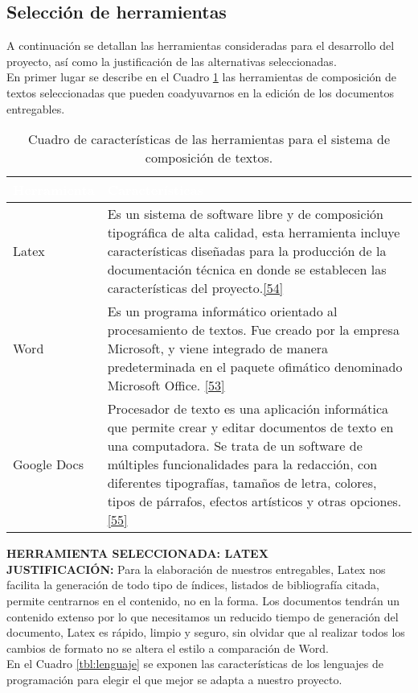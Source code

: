 \subsection{Selección de herramientas}

A continuación se detallan las herramientas consideradas para el desarrollo del proyecto, así como la justificación de las alternativas seleccionadas.\\

En primer lugar se describe en el Cuadro \ref{tbl:compotex} las herramientas de composición de textos seleccionadas que pueden coadyuvarnos en la edición de los documentos entregables.

\begin{table}[H]
	\centering
	\begin{tabular}{|p{3cm}|p{12cm}|}
		\hline
		 \rowcolor{black} \textcolor{white}{\textbf{Herramienta}} & \textcolor{white}{\textbf{Características}}  \\ \hline
		Latex & Es un sistema de software libre y de composición tipográfica de alta calidad, esta herramienta incluye características diseñadas para la producción de la documentación técnica en donde se establecen las características del proyecto.\hyperlink{b54}{[54]}\\
		\hline
		Word & Es un programa informático orientado al procesamiento de textos. Fue creado por la empresa Microsoft, y viene integrado de manera predeterminada en el paquete ofimático denominado Microsoft Office. \hyperlink{b53}{[53]}\\
		\hline
		Google Docs & Procesador de texto es una aplicación informática que permite crear y editar documentos de texto en una computadora. Se trata de un software de múltiples funcionalidades para la redacción, con diferentes tipografías, tamaños de letra, colores, tipos de párrafos, efectos artísticos y otras opciones. \hyperlink{b55}{[55]}\\
		\hline
	\end{tabular}
\caption{Cuadro de características de las herramientas para el sistema de composición de textos.}
\label{tbl:compotex}
\end{table}

\textbf {HERRAMIENTA SELECCIONADA: LATEX}\\

\textbf {JUSTIFICACIÓN:} Para la elaboración de nuestros entregables, Latex nos facilita la generación de todo tipo de índices, listados de bibliografía citada, permite centrarnos en el contenido, no en la forma. Los documentos tendrán un contenido extenso por lo que necesitamos un reducido tiempo de generación del documento, Latex es rápido, limpio y seguro, sin olvidar que al realizar todos los cambios de formato no se altera el estilo a comparación de Word.\\
\newpage
En el Cuadro \ref{tbl:lenguaje} se exponen las características de los lenguajes de programación para elegir el que mejor se adapta a nuestro proyecto.

